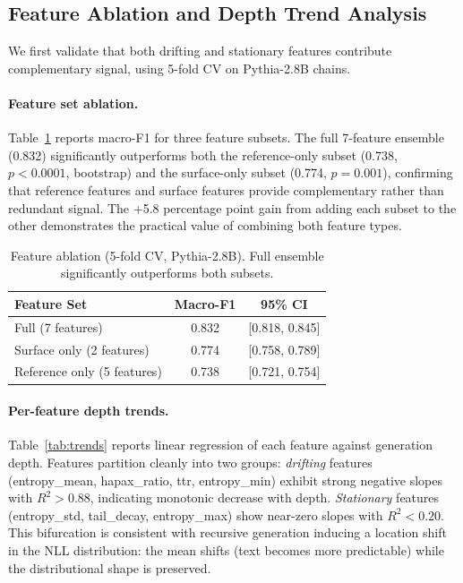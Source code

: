 \documentclass[11pt,a4paper]{article}
\begin{document}
\subsection{Feature Ablation and Depth Trend Analysis}
\label{sec:ablation}

We first validate that both drifting and stationary features contribute complementary signal, using 5-fold CV on Pythia-2.8B chains.

\paragraph{Feature set ablation.} Table~\ref{tab:ablation} reports macro-F1 for three feature subsets. The full 7-feature ensemble (0.832) significantly outperforms both the reference-only subset (0.738, $p < 0.0001$, bootstrap) and the surface-only subset (0.774, $p = 0.001$), confirming that reference features and surface features provide complementary rather than redundant signal. The +5.8 percentage point gain from adding each subset to the other demonstrates the practical value of combining both feature types.

\begin{table}[t]
\centering
\caption{Feature ablation (5-fold CV, Pythia-2.8B). Full ensemble significantly outperforms both subsets.}
\label{tab:ablation}
\begin{tabular}{lcc}
\toprule
Feature Set & Macro-F1 & 95\% CI \\
\midrule
Full (7 features) & 0.832 & [0.818, 0.845] \\
Surface only (2 features) & 0.774 & [0.758, 0.789] \\
Reference only (5 features) & 0.738 & [0.721, 0.754] \\
\bottomrule
\end{tabular}
\end{table}

\paragraph{Per-feature depth trends.} Table~\ref{tab:trends} reports linear regression of each feature against generation depth. Features partition cleanly into two groups: \emph{drifting} features (entropy\_mean, hapax\_ratio, ttr, entropy\_min) exhibit strong negative slopes with $R^2 > 0.88$, indicating monotonic decrease with depth. \emph{Stationary} features (entropy\_std, tail\_decay, entropy\_max) show near-zero slopes with $R^2 < 0.20$. This bifurcation is consistent with recursive generation inducing a location shift in the NLL distribution: the mean shifts (text becomes more predictable) while the distributional shape is preserved.
\end{document}
